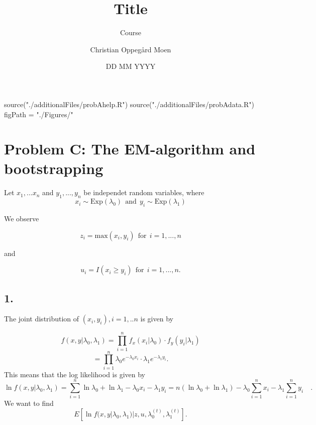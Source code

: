 \documentclass[
]{article}
\title{Title}
\subtitle{Course}
\author{Christian Oppegård Moen}
\date{DD MM YYYY}
\newenvironment{Shaded}{\begin{snugshade}}{\end{snugshade}}
\newcommand{\FunctionTok}[1]{\textcolor[rgb]{0.00,0.00,0.00}{#1}}
\newcommand{\NormalTok}[1]{#1}
\newcommand{\OtherTok}[1]{\textcolor[rgb]{0.56,0.35,0.01}{#1}}
\newcommand{\StringTok}[1]{\textcolor[rgb]{0.31,0.60,0.02}{#1}}
\begin{document}
\maketitle

{
\hypersetup{linkcolor=}
\setcounter{tocdepth}{3}
\tableofcontents
}
\begin{Shaded}
\begin{Highlighting}[]
\FunctionTok{source}\NormalTok{(}\StringTok{"./additionalFiles/probAhelp.R"}\NormalTok{)}
\FunctionTok{source}\NormalTok{(}\StringTok{"./additionalFiles/probAdata.R"}\NormalTok{)}
\NormalTok{figPath }\OtherTok{=} \StringTok{"./Figures/"}
\end{Highlighting}
\end{Shaded}

\hypertarget{problem-c-the-em-algorithm-and-bootstrapping}{%
\section{Problem C: The EM-algorithm and bootstrapping}\label{problem-c-the-em-algorithm-and-bootstrapping}}

Let \(x_1,...x_n\) and \(y_1,...,y_n\) be independet random variables, where
\[
x_i \sim \text{Exp}(\lambda_0) \ \ \text{and} \ \ y_i \sim \text{Exp}(\lambda_1)
\]

We observe

\[
z_i =\text{max}(x_i, y_i) \ \ \text{for} \ \ i=1,...,n
\]

and

\[
u_i=I(x_i \geq y_i) \ \ \text{for} \ \ i=1,...,n.
\]

\hypertarget{section}{%
\subsection{1.}\label{section}}

The joint distribution of \((x_i, y_i),i=1,..n\) is given by

\[
f(x, y | \lambda_0, \lambda_1)=\prod_{i=1}^{n} f_{x}(x_i | \lambda_0) \cdot f_{y}(y_i|\lambda_1)
\]
\[
=\prod_{i=1}^{n}\lambda_0 e^{-\lambda_0 x_i} \cdot \lambda_1 e^{-\lambda_1 y_i}.
\]
This means that the log likelihood is given by
\[
\ln f(x,y|\lambda_0, \lambda_1)=\sum_{i=1}^{n} \ln \lambda_0+ \ln \lambda_1-\lambda_0 x_i - \lambda_1 y_i=n(\ln \lambda_0+ \ln \lambda_1)-\lambda_0\sum_{i=1}^n x_i -\lambda_1\sum_{i=1}^n y_i \quad.
\]
We want to find
\[
E\left[ \ln f(x,y|\lambda_0, \lambda_1)| z, u, \lambda_0^{(t)}, \lambda_1^{(t)} \right].
\]
\end{document}
